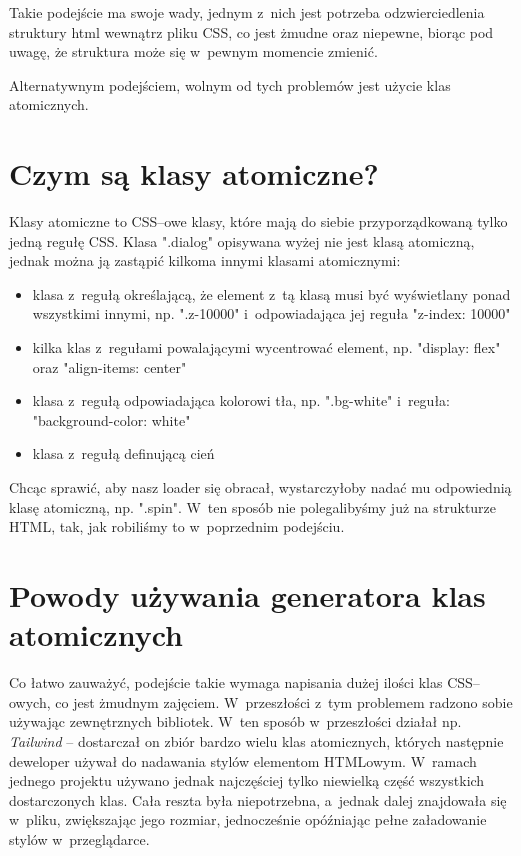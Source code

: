 \documentclass{SGGW-thesis}
\begin{document}
Takie podejście ma swoje wady, jednym z~nich jest potrzeba odzwierciedlenia struktury html wewnątrz pliku CSS, co jest żmudne oraz niepewne, biorąc pod uwagę, że struktura może się w~pewnym momencie zmienić.

Alternatywnym podejściem, wolnym od tych problemów jest użycie klas atomicznych\cite{css_master}.


\section{Czym są klasy atomiczne?}
Klasy atomiczne to CSS--owe klasy, które mają do siebie przyporządkowaną tylko jedną regułę CSS. Klasa ".dialog" opisywana wyżej nie jest klasą atomiczną, jednak można ją zastąpić kilkoma innymi klasami atomicznymi:
\begin{itemize}
    \item klasa z~regułą określającą, że element z~tą klasą musi być wyświetlany ponad wszystkimi innymi, np. ".z-10000" i~odpowiadająca jej reguła "z-index: 10000"
    \item kilka klas z~regułami powalającymi wycentrować element, np. "display: flex" oraz "align-items: center"
    \item klasa z~regułą odpowiadająca kolorowi tła, np. ".bg-white" i~reguła: "background-color: white"
    \item klasa z~regułą definującą cień
\end{itemize}

Chcąc sprawić, aby nasz loader się obracał, wystarczyłoby nadać mu odpowiednią klasę atomiczną, np. ".spin". W~ten sposób nie polegalibyśmy już na strukturze HTML, tak, jak robiliśmy to w~poprzednim podejściu.


\section{Powody używania generatora klas atomicznych}
Co łatwo zauważyć, podejście takie wymaga napisania dużej ilości klas CSS--owych, co jest żmudnym zajęciem. W~przeszłości z~tym problemem radzono sobie używając zewnętrznych bibliotek. W~ten sposób w~przeszłości działał np. \emph{Tailwind} -- dostarczał on zbiór bardzo wielu klas atomicznych, których następnie deweloper używał do nadawania stylów elementom HTMLowym. W~ramach jednego projektu używano jednak najczęściej tylko niewielką część wszystkich dostarczonych klas. Cała reszta była niepotrzebna, a~jednak dalej znajdowała się w~pliku, zwiększając jego rozmiar, jednocześnie opóźniając pełne załadowanie stylów w~przeglądarce.
\end{document}
